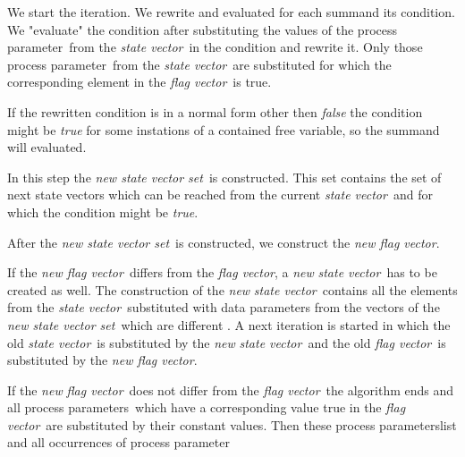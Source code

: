 \documentclass[a4paper,10pt]{article}
\theoremstyle{plain}
\theoremstyle{definition}
\newcommand{\pp}{process parameter}
\newcommand{\pps}{process parameters}
\newcommand{\ti}{\textit}
\newcommand{\sv}{\textit{state vector}}
\newcommand{\fv}{\textit{flag vector}}
\newcommand{\svs}{\textit{new state vector set}}
\newcommand{\nfv}{\textit{new flag vector}}
\begin{document}
We start the iteration. We rewrite and evaluated for each summand its condition. We "evaluate" the condition after substituting the values of the \pp\ from the \sv\ in the condition and rewrite it. Only those \pp\ from the \sv\ are substituted for which the corresponding element in the \fv\ is true. 

If the rewritten condition is in a normal form other then \ti{false} the condition might be \ti{true} for some instations of a contained free variable, so the summand will evaluated. 

In this step the \svs\ is constructed. This set contains the set of next state vectors which can be reached from the current \sv\ and for which the condition might be \ti{true}. 

After the \svs\ is constructed, we construct the \nfv . 


 
If the \nfv\ differs from the \fv , a \ti{new} \sv\ has to be created as well. The construction of the \ti{new} \sv\ contains all the elements from the \sv\ substituted with data parameters from the vectors of the \svs\ which are different . 
A next iteration is started in which the old \sv\ is substituted by the \ti{new} \sv\ and the old \fv\ is substituted by the \nfv .
  
If the \ti{new} \fv\ does not differ from the \fv\ the algorithm ends and all \pps\ which have a corresponding value true in the \fv\ are substituted by their constant values. Then these \pps list and all occurrences of \pp\ 
\end{document}
